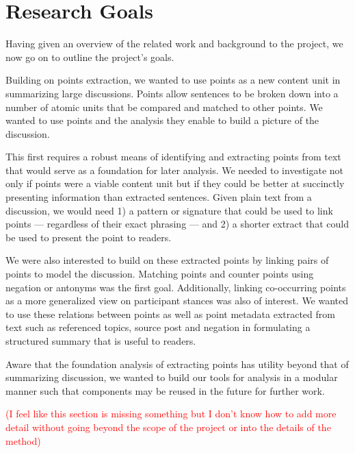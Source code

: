 \chapter{Research Goals\label{chap:res-goals}}
  Having given an overview of the related work and background to the project, we now go on to outline the project's goals.

  Building on points extraction, we wanted to use points as a new content unit in summarizing large discussions. Points allow sentences to be broken down into a number of atomic units that be compared and matched to other points. We wanted to use points and the analysis they enable to build a picture of the discussion.

  This first requires a robust means of identifying and extracting points from text that would serve as a foundation for later analysis. We needed to investigate not only if points were a viable content unit but if they could be better at succinctly presenting information than extracted sentences. Given plain text from a discussion, we would need 1) a pattern or signature that could be used to link points --- regardless of their exact phrasing --- and 2) a shorter extract that could be used to present the point to readers.

  We were also interested to build on these extracted points by linking pairs of points to model the discussion. Matching points and counter points using negation or antonyms was the first goal. Additionally, linking co-occurring points as a more generalized view on participant stances was also of interest. We wanted to use these relations between points as well as point metadata extracted from text such as referenced topics, source post and negation in formulating a structured summary that is useful to readers.

  Aware that the foundation analysis of extracting points has utility beyond that of summarizing discussion, we wanted to build our tools for analysis in a modular manner such that components may be reused in the future for further work.

  \textcolor{red}{(I feel like this section is missing something but I don't know how to add more detail without going beyond the scope of the project or into the details of the method)}
